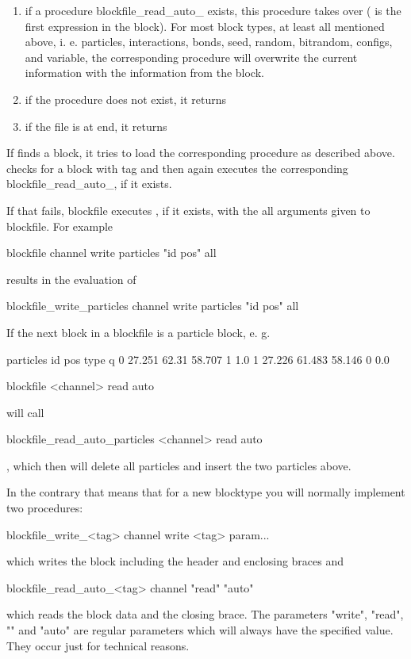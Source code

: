 \begin{enumerate}
  \begin{enumerate}
  \item if a procedure blockfile\_read\_auto\_ exists, this
    procedure takes over ( is the first expression in the
    block). For most block types, at least all mentioned above, i. e.
    particles, interactions, bonds, seed, random, bitrandom, configs,
    and variable, the corresponding procedure will overwrite the
    current information with the information from the block.
  \item if the procedure does not exist, it returns 
  \item if the file is at end, it returns 
  \end{enumerate}
\end{enumerate}
If  finds a block, it tries to
load the corresponding procedure as described above.
 checks for a block with tag
 and then again executes the corresponding
blockfile\_read\_auto\_, if it exists.

If that fails, blockfile executes , if
it exists, with the all arguments given to blockfile. For example
\begin{code}
blockfile channel write particles "id pos" all 
\end{code}
results in the evaluation of
\begin{code}
blockfile\_write\_particles channel write particles "id pos" all 
\end{code}
If the next block in a blockfile is a particle block, e. g.
\begin{tclcode}
{particles {id pos type q}
           {0 27.251 62.31 58.707 1 1.0}
           {1 27.226 61.483 58.146 0 0.0}
}
\end{tclcode}	
\begin{code}
  blockfile <channel> read auto
\end{code}
will call
\begin{code}
blockfile_read_auto_particles <channel> read auto
\end{code}
, which then will delete all particles and insert the two particles
above.

In the contrary that means that for a new blocktype you will normally
implement two procedures:
\begin{tclcode}
blockfile_write_<tag> {channel write <tag> param...}
\end{tclcode}
which writes the block including the header and enclosing braces and
\begin{tclcode}
blockfile_read_auto_<tag> {channel "read" "auto"}
\end{tclcode}
which reads the block data and the closing brace. The parameters
"write", "read", "" and "auto" are regular parameters which
will always have the specified value. They occur just for technical
reasons.

